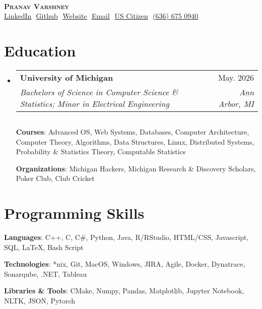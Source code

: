 \documentclass[letterpaper,11pt]{article}
\makeatletter
\newcommand{\resumeSubheading}[4]{
  \vspace{-2pt}\item
    \begin{tabular*}{0.97\textwidth}[t]{l@{\extracolsep{\fill}}r}
      \textbf{#1} & #2 \\
      \textit{\small#3} & \textit{\small #4} \\
    \end{tabular*}\vspace{-7pt}
}
\newcommand{\resumeSubHeadingListStart}{\begin{itemize}[leftmargin=0.15in, 
label={}]}
\newcommand{\resumeSubHeadingListEnd}{\end{itemize}}
\makeatother
\begin{document}

\begin{center}
\textbf{} \\ \vspace{2pt}
    \textbf{\Huge \scshape Pranav Varshney} \\ \vspace{4pt}
    \small 
    \href{https://linkedin.com/in/pvarshh}{\underline{LinkedIn}} $ $
    \href{https://github.com/pvarshh}{\underline{Github}} $ $
    \href{https://term-nav.vercel.app/}
    {\underline{Website}} $  $
    \href{mailto:pvarsh@umich.edu}
    {\underline{Email}} $ $
    {\underline{US Citizen}} $ $
    {\underline{(636) 675 0940}}
\end{center}


\section{Education}
  \resumeSubHeadingListStart
    \resumeSubheading
      {University of Michigan}{May. 2026}
      {Bachelors of Science in Computer Science \& Statistics; Minor in 
Electrical Engineering}{Ann Arbor, MI} $ $

      \textbf{Courses}{: Advanced OS, Web Systems, Databases, Computer 
Architecture, Computer Theory, Algorithms, Data Structures, Linux, 
Distributed Systems, Probability \& Statistics Theory, Computable 
Statistics}

      \vspace{-2pt}

      \textbf{Organizations}{: Michigan Hackers, Michigan Research \& 
Discovery Scholars, Poker Club, Club Cricket}
      
  \resumeSubHeadingListEnd

\section{Programming Skills}
 \begin{itemize}[leftmargin=0.15in, label={}]
    \small{\item{

     \textbf{Languages}{: C++, C, C\#, Python, Java, R/RStudio, HTML/CSS, 
Javascript, SQL, LaTeX, Bash Script} $ $

     \textbf{Technologies}{: *nix, Git, MacOS, Windows, JIRA, Agile, 
Docker, Dynatrace, Sonarqube, .NET, Tableau} $ $

     \textbf{Libraries \& Tools}{: CMake, Numpy, Pandas, Matplotlib, 
Jupyter Notebook, NLTK, JSON, Pytorch} $ $

    }}
 \end{itemize}
\end{document}
